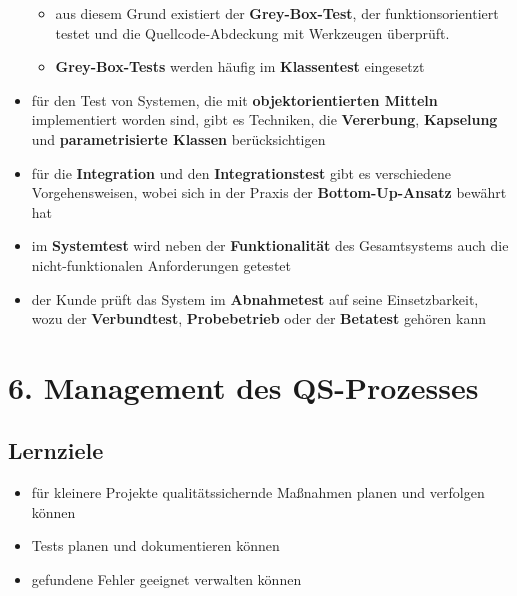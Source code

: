 \begin{itemize}
\begin{itemize}
        \item aus diesem Grund existiert der \textbf{Grey-Box-Test}, der funktionsorientiert testet und die Quellcode-Abdeckung mit Werkzeugen überprüft.
        \item \textbf{Grey-Box-Tests} werden häufig im \textbf{Klassentest} eingesetzt
    \end{itemize}
    \item für den Test von Systemen, die mit \textbf{objektorientierten Mitteln} implementiert worden sind, gibt es Techniken, die \textbf{Vererbung}, \textbf{Kapselung}  und \textbf{parametrisierte Klassen} berücksichtigen
    \item für die \textbf{Integration} und den \textbf{Integrationstest} gibt es verschiedene Vorgehensweisen, wobei sich in der Praxis der \textbf{Bottom-Up-Ansatz} bewährt hat
    \item im \textbf{Systemtest} wird neben der \textbf{Funktionalität} des Gesamtsystems auch die nicht-funktionalen Anforderungen getestet
    \item der Kunde prüft das System im \textbf{Abnahmetest} auf seine Einsetzbarkeit, wozu der \textbf{Verbundtest}, \textbf{Probebetrieb} oder der \textbf{Betatest} gehören kann
\end{itemize}

\section*{6. Management des QS-Prozesses}
\subsection*{Lernziele}
\begin{itemize}
    \item für kleinere Projekte qualitätssichernde Maßnahmen planen und verfolgen können
    \item Tests planen und dokumentieren können
    \item gefundene Fehler geeignet verwalten können
\end{itemize}


